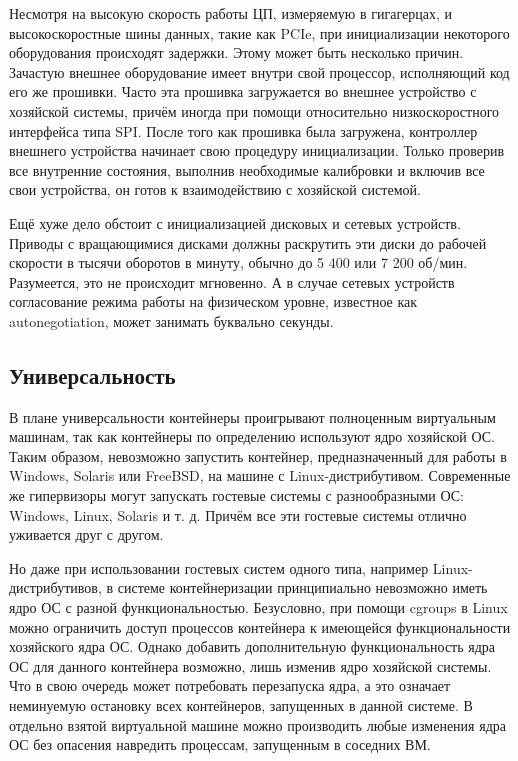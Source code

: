 \documentclass[14pt, a4paper]{article}
\begin{document}
Несмотря на высокую скорость работы ЦП, измеряемую в гигагерцах, и высокоскоростные шины
данных, такие как PCIe, при инициализации некоторого оборудования происходят задержки. Этому
может быть несколько причин. Зачастую внешнее оборудование имеет внутри свой процессор,
исполняющий код его же прошивки. Часто эта прошивка загружается во внешнее устройство с
хозяйской системы, причём иногда при помощи относительно низкоскоростного интерфейса типа SPI.
После того как прошивка была загружена, контроллер внешнего устройства начинает свою процедуру
инициализации. Только проверив все внутренние состояния, выполнив необходимые калибровки и
включив все свои устройства, он готов к взаимодействию с хозяйской системой.

Ещё хуже дело обстоит с инициализацией дисковых и сетевых устройств. Приводы с вращающимися
дисками должны раскрутить эти диски до рабочей скорости в тысячи оборотов в минуту, обычно до
5 400 или 7 200 об/мин. Разумеется, это не происходит мгновенно. А в случае сетевых устройств
согласование режима работы на физическом уровне, известное как autonegotiation, может занимать
буквально секунды.\\

\subsection*{Универсальность}

В плане универсальности контейнеры проигрывают полноценным виртуальным машинам, так как
контейнеры по определению используют ядро хозяйской ОС. Таким образом, невозможно запустить
контейнер, предназначенный для работы в Windows, Solaris или FreeBSD, на машине с
Linux-дистрибутивом. Современные же гипервизоры могут запускать гостевые системы с
разнообразными ОС: Windows, Linux, Solaris и т. д. Причём все эти гостевые системы отлично
уживается друг с другом.

Но даже при использовании гостевых систем одного типа, например Linux-дистрибутивов, в системе
контейнеризации принципиально невозможно иметь ядро ОС с разной функциональностью.
Безусловно, при помощи cgroups в Linux можно ограничить доступ процессов контейнера к
имеющейся функциональности хозяйского ядра ОС. Однако добавить дополнительную
функциональность ядра ОС для данного контейнера возможно, лишь изменив ядро хозяйской
системы. Что в свою очередь может потребовать перезапуска ядра, а это означает неминуемую
остановку всех контейнеров, запущенных в данной системе. В отдельно взятой виртуальной машине
можно производить любые изменения ядра ОС без опасения навредить процессам, запущенным в
соседних ВМ.\\
\end{document}
